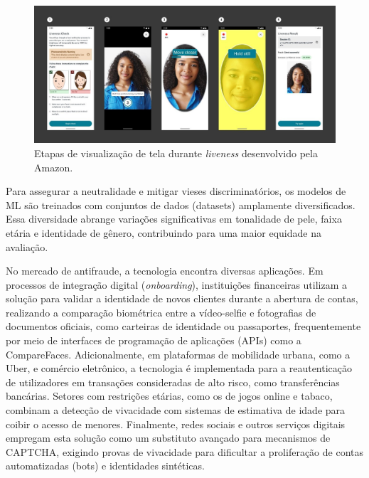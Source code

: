 \begin{figure}[htb]
        \centering
        \includegraphics[width=16cm]{figuras/aws_liveness.jpg}
        \caption{Etapas de visualização de tela durante \textit{liveness} desenvolvido pela Amazon.}
        \label{fig:aws_liveness}
\end{figure}

Para assegurar a neutralidade e mitigar vieses discriminatórios, os modelos de ML são treinados com conjuntos de dados (datasets) amplamente diversificados. Essa diversidade abrange variações significativas em tonalidade de pele, faixa etária e identidade de gênero, contribuindo para uma maior equidade na avaliação. \cite{aws_blog_2023}

No mercado de antifraude, a tecnologia encontra diversas aplicações. Em processos de integração digital (\textit{onboarding}), instituições financeiras utilizam a solução para validar a identidade de novos clientes durante a abertura de contas, realizando a comparação biométrica entre a vídeo-selfie e fotografias de documentos oficiais, como carteiras de identidade ou passaportes, frequentemente por meio de interfaces de programação de aplicações (APIs) como a CompareFaces. Adicionalmente, em plataformas de mobilidade urbana, como a Uber, e comércio eletrônico, a tecnologia é implementada para a reautenticação de utilizadores em transações consideradas de alto risco, como transferências bancárias. Setores com restrições etárias, como os de jogos online e tabaco, combinam a detecção de vivacidade com sistemas de estimativa de idade para coibir o acesso de menores. Finalmente, redes sociais e outros serviços digitais empregam esta solução como um substituto avançado para mecanismos de CAPTCHA, exigindo provas de vivacidade para dificultar a proliferação de contas automatizadas (bots) e identidades sintéticas. \cite{aws_rekognition_2023}

